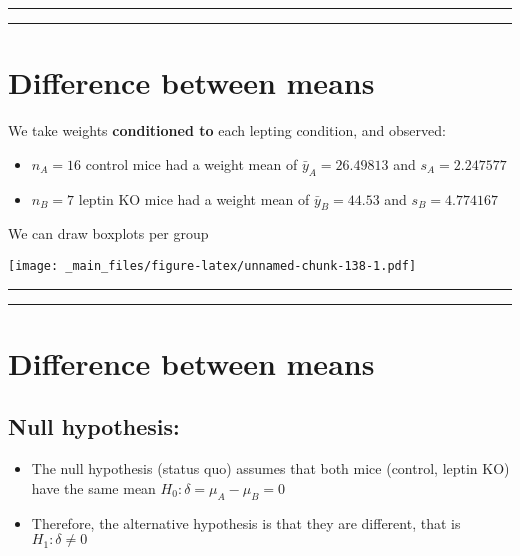 \documentclass[
]{book}
\begin{document}
\begin{center}\rule{0.5\linewidth}{0.5pt}\end{center}

\begin{center}\rule{0.5\linewidth}{0.5pt}\end{center}

\hypertarget{difference-between-means-6}{%
\section{Difference between means}\label{difference-between-means-6}}

We take weights \textbf{conditioned to} each lepting condition, and observed:

\begin{itemize}
\item
  \(n_A=16\) control mice had a weight mean of \(\bar{y}_A=26.49813\) and \(s_A=2.247577\)
\item
  \(n_B=7\) leptin KO mice had a weight mean of \(\bar{y}_B=44.53\) and \(s_B=4.774167\)
\end{itemize}

We can draw boxplots per group

\texttt{[image: \_main\_files/figure-latex/unnamed-chunk-138-1.pdf]}

\begin{center}\rule{0.5\linewidth}{0.5pt}\end{center}

\begin{center}\rule{0.5\linewidth}{0.5pt}\end{center}

\hypertarget{difference-between-means-7}{%
\section{Difference between means}\label{difference-between-means-7}}

\hypertarget{null-hypothesis-5}{%
\subsection{Null hypothesis:}\label{null-hypothesis-5}}

\begin{itemize}
\item
  The null hypothesis (status quo) assumes that both mice (control, leptin KO) have the same mean \(H_0: \delta=\mu_A-\mu_B=0\)
\item
  Therefore, the alternative hypothesis is that they are different, that is \(H_1: \delta \neq 0\)
\end{itemize}
\end{document}
